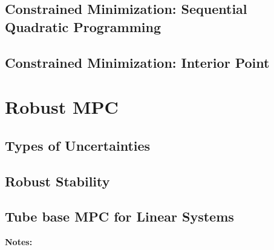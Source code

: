 \documentclass[english]{latex4ei/latex4ei_sheet}
\begin{document}
\begin{sectionbox}
\subsection{Constrained Minimization: Sequential Quadratic Programming}

\subsection{Constrained Minimization: Interior Point}

\end{sectionbox}


\section{Robust MPC}
\begin{sectionbox}

\subsection{Types of Uncertainties}

\subsection{Robust Stability}

\subsection{Tube base MPC for Linear Systems}

\end{sectionbox}
\textbf{Notes:}

\end{document}
